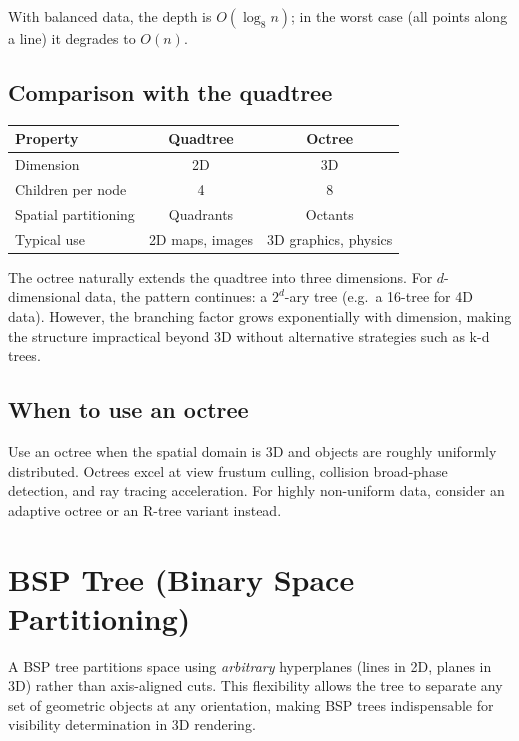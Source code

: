 With balanced data, the depth is $O(\log_8 n)$; in the worst case (all points along a line) it degrades to $O(n)$.

\subsection{Comparison with the quadtree}

\begin{center}
\begin{tabular}{lcc}
\toprule
Property & Quadtree & Octree \\
\midrule
Dimension & 2D & 3D \\
Children per node & 4 & 8 \\
Spatial partitioning & Quadrants & Octants \\
Typical use & 2D maps, images & 3D graphics, physics \\
\bottomrule
\end{tabular}
\end{center}

The octree naturally extends the quadtree into three dimensions. For $d$-dimensional data, the pattern continues: a $2^d$-ary tree (e.g.\ a 16-tree for 4D data). However, the branching factor grows exponentially with dimension, making the structure impractical beyond 3D without alternative strategies such as k-d trees.

\subsection{When to use an octree}

Use an octree when the spatial domain is 3D and objects are roughly uniformly distributed. Octrees excel at view frustum culling, collision broad-phase detection, and ray tracing acceleration. For highly non-uniform data, consider an adaptive octree or an R-tree variant instead.


\section{BSP Tree (Binary Space Partitioning)}

A BSP tree partitions space using \emph{arbitrary} hyperplanes (lines in 2D, planes in 3D) rather than axis-aligned cuts. This flexibility allows the tree to separate any set of geometric objects at any orientation, making BSP trees indispensable for visibility determination in 3D rendering.

